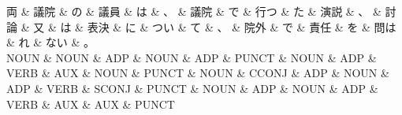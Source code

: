 \documentclass[tikz,border=5pt]{standalone}
\begin{document}
\normalsize
\begin{dependency}[edge unit distance=11.9pt]
    \begin{deptext}[column sep=1em]
        両 \& 議院 \& の \& 議員 \& は \& 、 \& 議院 \& で \& 行つ \& た \& 演説 \& 、 \& 討論 \& 又 \& は \& 表決 \& に \& つい \& て \& 、 \& 院外 \& で \& 責任 \& を \& 問は \& れ \& ない \& 。\\
        NOUN \& NOUN \& ADP \& NOUN \& ADP \& PUNCT \& NOUN \& ADP \& VERB \& AUX \& NOUN \& PUNCT \& NOUN \& CCONJ \& ADP \& NOUN \& ADP \& VERB \& SCONJ \& PUNCT \& NOUN \& ADP \& NOUN \& ADP \& VERB \& AUX \& AUX \& PUNCT\\
    \end{deptext}
\end{dependency}
\end{document}
